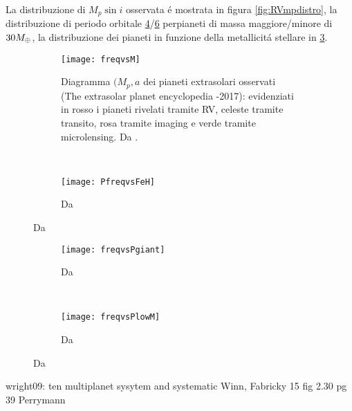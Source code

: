 \begin{workout}

La distribuzione di $M_p\sin{i}$ osservata \'e mostrata in figura \ref{fig:RVmpdistro}, la distribuzione di periodo orbitale \ref{fig:PdistroM30}/\ref{fig:Pdistrom30} perpianeti di massa maggiore/minore di $30M_{\oplus}{}$, la distribuzione dei pianeti in funzione della metallicit\'a stellare in \ref{fig:freqZstar}.

\begin{figure}[!ht]
\begin{subfigure}[b]{0.47\textwidth}
\texttt{[image: freqvsM]}
\caption{Diagramma $(M_p,a$ dei pianeti extrasolari osservati (The extrasolar planet encyclopedia -2017): evidenziati in rosso i pianeti rivelati tramite RV, celeste tramite transito, rosa tramite imaging e verde tramite microlensing. Da \cite{howard2012planet}.}\label{fig:Mdistro}
\end{subfigure}
~
\begin{subfigure}[b]{0.47\textwidth}
\texttt{[image: PfreqvsFeH]}\label{fig:freqZstar}
\caption{Da \cite{mayor2011harps}}
\end{subfigure}
\end{figure}

\begin{figure}[!ht]
\begin{subfigure}[b]{0.47\textwidth}
\centering
\texttt{[image: freqvsPgiant]}
\caption{Da \cite{mayor2011harps}}\label{fig:PdistroM30}
\end{subfigure}
~
\begin{subfigure}[b]{0.47\textwidth}
\centering
\texttt{[image: freqvsPlowM]}\label{fig:Pdistrom30}
\caption{Da \cite{mayor2011harps}}
\end{subfigure}
\end{figure}

\end{workout}

\begin{workout}
wright09: ten multiplanet sysytem and systematic
Winn, Fabricky 15
fig 2.30 pg 39 Perrymann
\end{workout}


